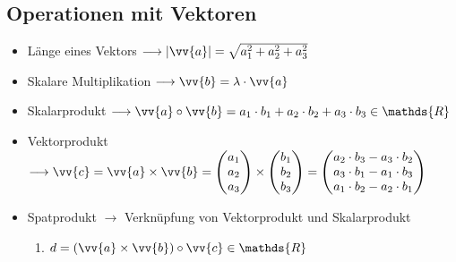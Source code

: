 \subsection{Operationen mit Vektoren}
\begin{itemize}
\item Länge eines Vektors $\longrightarrow |\vv{a}| = \sqrt{a_1^2 + a_2^2 + a_3^2}$
\item Skalare Multiplikation $\longrightarrow \vv{b} = \lambda \cdot \vv{a} $
\item Skalarprodukt $\longrightarrow \vv{a}\circ \vv{b} = a_1\cdot b_1 + a_2\cdot b_2 + a_3\cdot b_3 \in \mathds{R}$
\item Vektorprodukt \\$\longrightarrow\vv{c} = \vv{a} \times \vv{b} = \begin{pmatrix} a_1 \\a_2\\a_3\end{pmatrix} \times \begin{pmatrix} b_1 \\b_2\\b_3\end{pmatrix} = \begin{pmatrix} a_2\cdot b_3 - a_3\cdot b_2 \\a_3\cdot b_1 - a_1\cdot b_3\\a_1\cdot b_2 - a_2\cdot b_1\end{pmatrix}$
\item Spatprodukt $\longrightarrow$ Verknüpfung von Vektorprodukt und Skalarprodukt\\
\begin{enumerate}
    \item $d = \left(\vv{a} \times\vv{b}\right) \circ\vv{c} \in \mathds{R}$
\end{enumerate}
\end{itemize}
